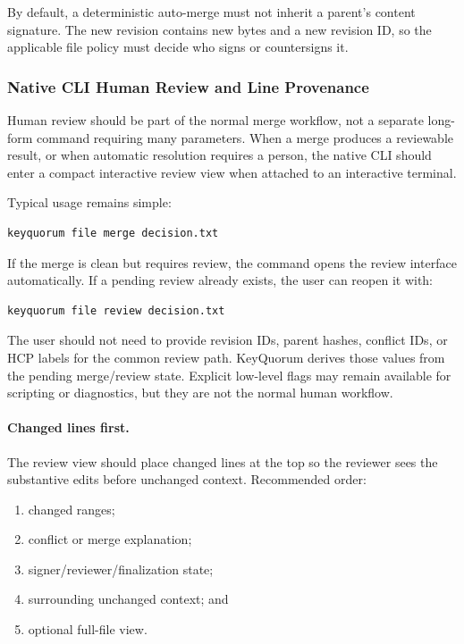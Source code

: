 \documentclass[11pt]{article}
\begin{document}
By default, a deterministic auto-merge must not inherit a parent's content signature. The new revision contains new bytes and a new revision ID, so the applicable file policy must decide who signs or countersigns it.


\subsubsection*{Native CLI Human Review and Line Provenance}

Human review should be part of the normal merge workflow, not a separate long-form command requiring many parameters. When a merge produces a reviewable result, or when automatic resolution requires a person, the native CLI should enter a compact interactive review view when attached to an interactive terminal.

Typical usage remains simple:

\begin{lstlisting}
keyquorum file merge decision.txt
\end{lstlisting}

If the merge is clean but requires review, the command opens the review interface automatically. If a pending review already exists, the user can reopen it with:

\begin{lstlisting}
keyquorum file review decision.txt
\end{lstlisting}

The user should not need to provide revision IDs, parent hashes, conflict IDs, or HCP labels for the common review path. KeyQuorum derives those values from the pending merge/review state. Explicit low-level flags may remain available for scripting or diagnostics, but they are not the normal human workflow.

\paragraph{Changed lines first.}

The review view should place changed lines at the top so the reviewer sees the substantive edits before unchanged context. Recommended order:

\begin{enumerate}[leftmargin=1.8em]
  \item changed ranges;
  \item conflict or merge explanation;
  \item signer/reviewer/finalization state;
  \item surrounding unchanged context; and
  \item optional full-file view.
\end{enumerate}
\end{document}
